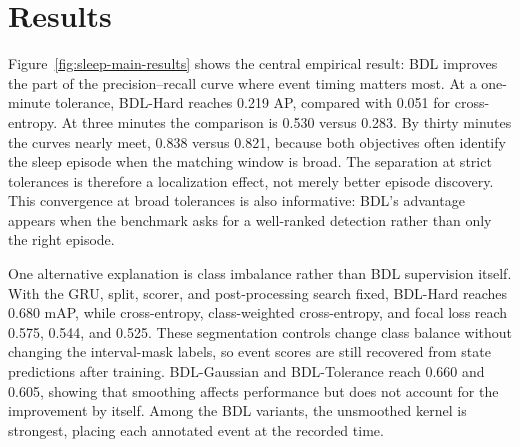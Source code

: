 \section{Results}
\label{sec:results}



Figure~\ref{fig:sleep-main-results} shows the central empirical result: BDL improves the part of the precision--recall curve where event timing matters most.
At a one-minute tolerance, BDL-Hard reaches 0.219 AP, compared with 0.051 for cross-entropy.
At three minutes the comparison is 0.530 versus 0.283.
By thirty minutes the curves nearly meet, 0.838 versus 0.821, because both objectives often identify the sleep episode when the matching window is broad.
The separation at strict tolerances is therefore a localization effect, not merely better episode discovery.
This convergence at broad tolerances is also informative: BDL's advantage appears when the benchmark asks for a well-ranked detection rather than only the right episode.

One alternative explanation is class imbalance rather than BDL supervision itself.
With the GRU, split, scorer, and post-processing search fixed, BDL-Hard reaches 0.680 mAP, while cross-entropy, class-weighted cross-entropy, and focal loss reach 0.575, 0.544, and 0.525.
These segmentation controls change class balance without changing the interval-mask labels, so event scores are still recovered from state predictions after training.
BDL-Gaussian and BDL-Tolerance reach 0.660 and 0.605, showing that smoothing affects performance but does not account for the improvement by itself.
Among the BDL variants, the unsmoothed kernel is strongest, placing each annotated event at the recorded time.

